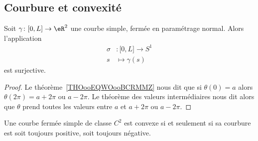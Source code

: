 \subsection{Courbure et convexité}
\label{SUBSECooNJOLooYuGRjA}

\begin{lemma}       \label{LEMooHMFSooFlhanD}
	Soit \(   \gamma\colon \mathopen[ 0 , L \mathclose]\to \eR^2    \) une courbe simple, fermée en paramétrage normal. Alors l'application
	\begin{equation}
		\begin{aligned}
			\sigma & \colon \mathopen[ 0 , L \mathclose]\to S^1 \\
			s      & \mapsto \gamma(s)
		\end{aligned}
	\end{equation}
	est surjective.
\end{lemma}

\begin{proof}
	Le théorème~\ref{THOooEQWOooBCRMMZ} nous dit que si \( \theta(0)=a\) alors \( \theta(2\pi)=a+2\pi\) ou \( a-2\pi\). Le théorème des valeurs intermédiaires nous dit alors que \( \theta\) prend toutes les valeurs entre \( a\) et \( a+2\pi\) ou \( a-2\pi\).
\end{proof}

\begin{proposition}      \label{PROPooWXUKooPOtPdj}
	Une courbe fermée simple de classe \(  C^{2}\) est convexe si et seulement si sa courbure est soit toujours positive, soit toujours négative.
\end{proposition}

